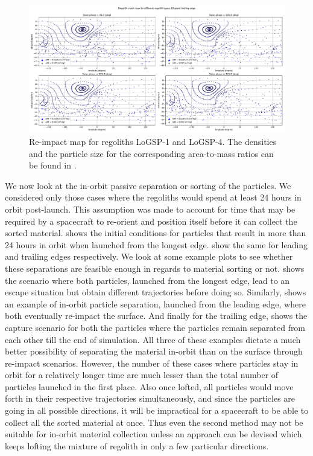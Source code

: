 \FloatBarrier
\begin{figure}[htb]
\centering
\captionsetup{justification=centering}
\includegraphics[angle=90, width=\textwidth, height=\textheight, keepaspectratio=true]{asteroid_mining/trailingEdge_crashMap.pdf}
\caption{Re-impact map for regoliths LoGSP-1 and LoGSP-4. The densities and the particle size for the corresponding area-to-mass ratios can be found in .}
\label{fig:trailingEdge_crashmap_sorting}
\end{figure}
\FloatBarrier
We now look at the in-orbit passive separation or sorting of the particles. We considered only those cases where the regoliths would spend at least 24 hours in orbit post-launch. This assumption was made to account for time that may be required by a spacecraft to re-orient and position itself before it can collect the sorted material.  shows the initial conditions for particles that result in more than 24 hours in orbit when launched from the longest edge.  show the same for leading and trailing edges respectively. We look at some example plots to see whether these separations are feasible enough in regards to material sorting or not.  shows the scenario where both particles, launched from the longest edge, lead to an escape situation but obtain different trajectories before doing so. Similarly,  shows an example of in-orbit particle separation, launched from the leading edge, where both eventually re-impact the surface. And finally for the trailing edge,  shows the capture scenario for both the particles where the particles remain separated from each other till the end of simulation. All three of these examples dictate a much better possibility of separating the material in-orbit than on the surface through re-impact scenarios. However, the number of these cases where particles stay in orbit for a relatively longer time are much lesser than the total number of particles launched in the first place. Also once lofted, all particles would move forth in their respective trajectories simultaneously, and since the particles are going in all possible directions, it will be impractical for a spacecraft to be able to collect all the sorted material at once. Thus even the second method may not be suitable for in-orbit material collection unless an approach can be devised which keeps lofting the mixture of regolith in only a few particular directions.
